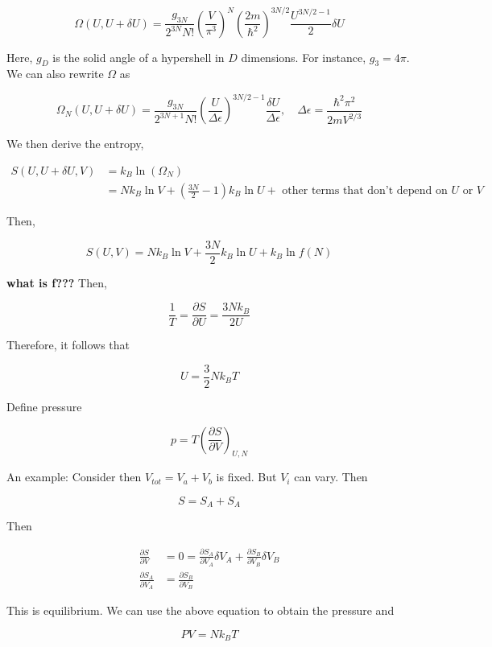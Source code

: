 \documentclass{article}
\newtheorem{one minute paper}[theorem]{One Minute Paper}
\begin{document}
\begin{equation}
    \Omega(U, U + \delta U) = \frac{g_{3N}}{2^{3N}N!}\left( \frac{V}{\pi^3} \right)^N\left( \frac{2m}{\hbar^2} \right)^{3N/2}\frac{U^{3N/2 - 1}}{2} \delta U
\end{equation}

Here, $g_{D}$ is the solid angle of a hypershell in $D$ dimensions. For instance, $g_{3} = 4\pi$. We can also rewrite $\Omega$ as 

\begin{equation}
    \Omega_N(U, U + \delta U) = \frac{g_{3N}}{2^{3N + 1}N!}\left( \frac{U}{\Delta \epsilon} \right)^{3N/2 - 1}\frac{\delta U}{\Delta \epsilon}, \quad \Delta \epsilon = \frac{\hbar^2 \pi^2}{2mV^{2/3}}
\end{equation}

We then derive the entropy, 

\begin{align}
    S(U,U + \delta U, V) &= k_B \ln(\Omega_N) \\
    &= Nk_B \ln V + \left( \frac{3N}{2} - 1\right)k_B \ln U + \text{ other terms that don't depend on $U$ or $V$}
\end{align}

Then, 

\begin{equation}
    S(U,V) = Nk_B \ln V + \frac{3N}{2}k_B \ln U + k_B \ln f(N)
\end{equation}

\textbf{what is f???} Then, 

\begin{equation}
    \frac{1}{T} = \frac{\partial S}{\partial U} = \frac{3N k_B}{2U}
\end{equation}

Therefore, it follows that 

\begin{equation}
    U = \frac{3}{2}Nk_B T
\end{equation}

Define pressure 

\begin{equation}
    p = T\left( \frac{\partial S}{\partial V} \right)_{U,N}
\end{equation}

An example:
Consider then $V_{tot} = V_a + V_b$ is fixed. But $V_i$ can vary. Then 

\begin{equation}
    S = S_A + S_A
\end{equation}

Then 

\begin{align}
    \frac{\partial S}{\partial V} &= 0 = \frac{\partial S_A}{\partial V_A}\delta V_A + \frac{\partial S_B}{\partial V_B}\delta V_B \\
    \frac{\partial S_A}{\partial V_A} &= \frac{\partial S_B}{\partial V_B}
\end{align}

This is equilibrium. We can use the above equation to obtain the pressure and 

\begin{equation}
    PV = Nk_B T
\end{equation}
\end{document}

